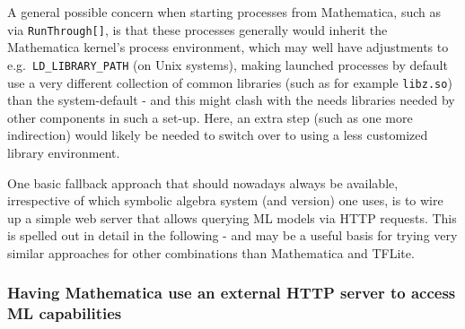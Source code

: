 \documentclass[11pt]{article}
\begin{document}
A general possible concern when starting processes from Mathematica,
such as via \texttt{RunThrough{[}{]}}, is that these processes generally
would inherit the Mathematica kernel's process environment, which may
well have adjustments to e.g.~\texttt{LD\_LIBRARY\_PATH} (on Unix
systems), making launched processes by default use a very different
collection of common libraries (such as for example \texttt{libz.so})
than the system-default - and this might clash with the needs libraries
needed by other components in such a set-up. Here, an extra step (such
as one more indirection) would likely be needed to switch over to using
a less customized library environment.

One basic fallback approach that should nowadays always be available,
irrespective of which symbolic algebra system (and version) one uses, is
to wire up a simple web server that allows querying ML models via HTTP
requests. This is spelled out in detail in the following - and may be a
useful basis for trying very similar approaches for other combinations
than Mathematica and TFLite.

    \hypertarget{having-mathematica-use-an-external-http-server-to-access-ml-capabilities}{%
\subsubsection{Having Mathematica use an external HTTP server to access
ML
capabilities}\label{having-mathematica-use-an-external-http-server-to-access-ml-capabilities}}
\end{document}
